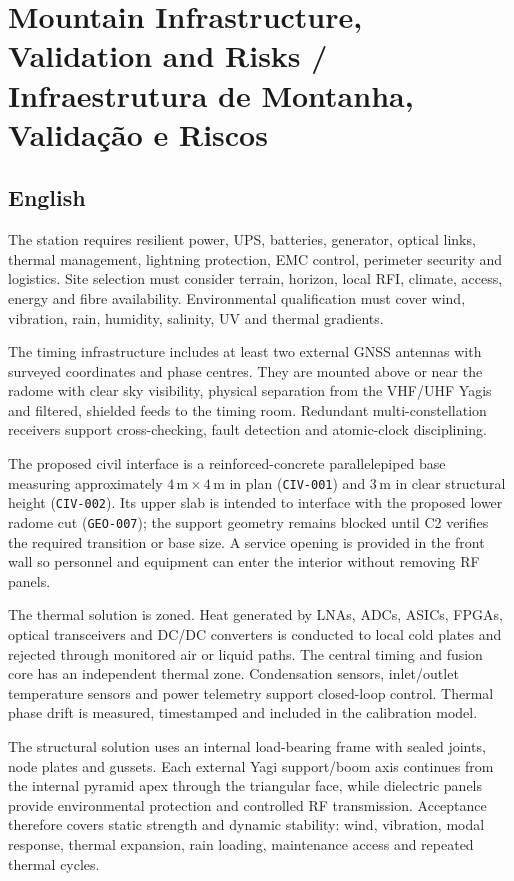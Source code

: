 \chapter{Mountain Infrastructure, Validation and Risks / Infraestrutura de Montanha, Validação e Riscos}

\section*{English}
The station requires resilient power, UPS, batteries, generator, optical links, thermal management, lightning protection, EMC control, perimeter security and logistics. Site selection must consider terrain, horizon, local RFI, climate, access, energy and fibre availability. Environmental qualification must cover wind, vibration, rain, humidity, salinity, UV and thermal gradients.

The timing infrastructure includes at least two external GNSS antennas with surveyed coordinates and phase centres. They are mounted above or near the radome with clear sky visibility, physical separation from the VHF/UHF Yagis and filtered, shielded feeds to the timing room. Redundant multi-constellation receivers support cross-checking, fault detection and atomic-clock disciplining.

The proposed civil interface is a reinforced-concrete parallelepiped base measuring approximately $4\,\mathrm{m}\times4\,\mathrm{m}$ in plan (\texttt{CIV-001}) and $3\,\mathrm{m}$ in clear structural height (\texttt{CIV-002}). Its upper slab is intended to interface with the proposed lower radome cut (\texttt{GEO-007}); the support geometry remains blocked until C2 verifies the required transition or base size. A service opening is provided in the front wall so personnel and equipment can enter the interior without removing RF panels.

The thermal solution is zoned. Heat generated by LNAs, ADCs, ASICs, FPGAs, optical transceivers and DC/DC converters is conducted to local cold plates and rejected through monitored air or liquid paths. The central timing and fusion core has an independent thermal zone. Condensation sensors, inlet/outlet temperature sensors and power telemetry support closed-loop control. Thermal phase drift is measured, timestamped and included in the calibration model.

The structural solution uses an internal load-bearing frame with sealed joints, node plates and gussets. Each external Yagi support/boom axis continues from the internal pyramid apex through the triangular face, while dielectric panels provide environmental protection and controlled RF transmission. Acceptance therefore covers static strength and dynamic stability: wind, vibration, modal response, thermal expansion, rain loading, maintenance access and repeated thermal cycles.

